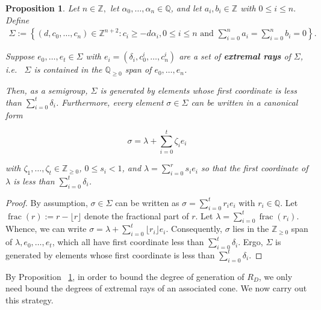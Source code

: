 \documentclass{amsart}
\theoremstyle{plain}
\newtheorem{prop}[thm]{Proposition}
\theoremstyle{definition}
\theoremstyle{remark}
\numberwithin{equation}{section}
\newcommand\bq{{\mathbb Q}}
\newcommand\bz{{\mathbb Z}}
\newcommand\pdeg{\delta}
\DeclareMathOperator{\fr}{frac}
\begin{document}
\begin{prop}
\label{prop:cone-generation}
Let $n \in \bz,$ let $\alpha_0, \ldots, \alpha_n \in \bq$, and let
$a_i, b_i \in \bz$ with $0 \leq i \leq n.$ Define
\begin{align*}
	\Sigma := \left \{(d, c_0, \ldots, c_n) \in \bz^{n + 2} \colon c_i \geq -
	d \alpha_i, 0 \leq i \leq n \text{ and } \sum_{i = 0}^{n} a_i =
	\sum_{i	= 0}^{n}b_i = 0 \right \}.
\end{align*}

\noindent
Suppose $e_0, \ldots, e_t \in \Sigma$ with $e_i = (\pdeg_i, c_0^i,
\ldots, c_n^i)$ are a set of {\bf extremal rays} of $\Sigma$,
i.e.~ $\Sigma$ is contained in the $\bq_{\geq 0}$ span of
$e_0, \ldots, e_n$.

Then, as a semigroup, $\Sigma$ is generated by
elements whose first coordinate is less than $\sum_{i = 0}^{t}
\pdeg_i$. Furthermore, every element $\sigma \in \Sigma$ can be
written in a canonical form 

\begin{equation}
	\label{eqn:sigma-canonical-form}
	\sigma = \lambda + \sum_{i = 0}^{t} \zeta_i e_i
\end{equation}

\noindent
with $\zeta_1, \ldots, \zeta_t \in \bz_{\geq 0}$, $0 \leq s_i < 1$, and $\lambda = \sum_{i = 0}^{r} s_i e_i$ 
so that the
first coordinate of $\lambda$ is less than $\sum_{i=0}^{t}\pdeg_i$.
\end{prop}

\begin{proof}
By assumption, $\sigma \in \Sigma$ can be written as $\sigma = \sum_
{i = 0}^{t} r_i e_i$ with $r_i \in \bq$. Let $\fr(r) := r - \lfloor r
\rfloor$ denote the fractional part of $r$. Let $\lambda = \sum_{i = 0}
^{t} \fr(r_i)$. Whence, we can write $\sigma = \lambda + \sum_{i = 0}
^{t} \lfloor r_i \rfloor e_i.$ Consequently, $\sigma$ lies in the
$\bz_{\geq 0}$ span of $\lambda, e_0, \ldots, e_t$, which all have
first coordinate less than $\sum_{i=0}^{t} \pdeg_i$. Ergo, $\Sigma$ is
generated by elements whose first coordinate is less than
$\sum_{i = 0}^{t} \pdeg_i$.
\end{proof}

By Proposition ~\ref{prop:cone-generation}, in order to bound
the degree of generation of $R_D$, we only need bound
the degrees of extremal rays of an associated cone. We now carry out
this strategy.
\end{document}
